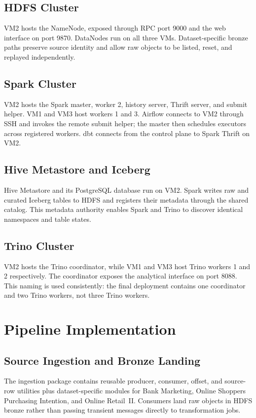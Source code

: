 \subsection{HDFS Cluster}
VM2 hosts the NameNode, exposed through RPC port 9000 and the web interface on port 9870. DataNodes run on all three VMs. Dataset-specific bronze paths preserve source identity and allow raw objects to be listed, reset, and replayed independently.

\subsection{Spark Cluster}
VM2 hosts the Spark master, worker 2, history server, Thrift server, and submit helper. VM1 and VM3 host workers 1 and 3. Airflow connects to VM2 through SSH and invokes the remote submit helper; the master then schedules executors across registered workers. dbt connects from the control plane to Spark Thrift on VM2.

\subsection{Hive Metastore and Iceberg}
Hive Metastore and its PostgreSQL database run on VM2. Spark writes raw and curated Iceberg tables to HDFS and registers their metadata through the shared catalog. This metadata authority enables Spark and Trino to discover identical namespaces and table states.

\subsection{Trino Cluster}
VM2 hosts the Trino coordinator, while VM1 and VM3 host Trino workers 1 and 2 respectively. The coordinator exposes the analytical interface on port 8088. This naming is used consistently: the final deployment contains one coordinator and two Trino workers, not three Trino workers.

\section{Pipeline Implementation}

\subsection{Source Ingestion and Bronze Landing}
The ingestion package contains reusable producer, consumer, offset, and source-row utilities plus dataset-specific modules for Bank Marketing, Online Shoppers Purchasing Intention, and Online Retail~II. Consumers land raw objects in HDFS bronze rather than passing transient messages directly to transformation jobs.

